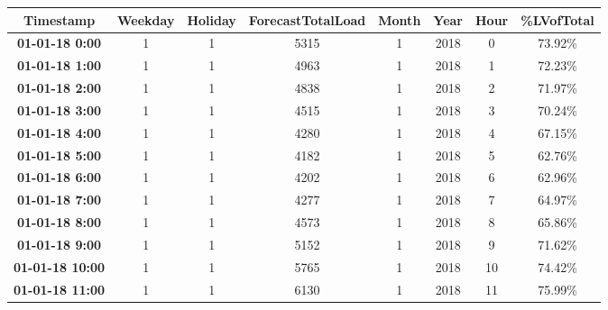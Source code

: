 \begin{table}[ht!]
\begin{tabular}{|c|c|c|c|c|c|c|c|}
\hline
\textbf{Timestamp}               & \textbf{Weekday} & \textbf{Holiday} & \textbf{ForecastTotalLoad} & \textbf{Month} & \textbf{Year} & \textbf{Hour} & \textbf{\%LVofTotal} \\ \hline
\textbf{01-01-18 0:00}  & 1                & 1                & 5315                       & 1              & 2018          & 0             & 73.92\%              \\ \hline
\textbf{01-01-18 1:00}  & 1                & 1                & 4963                       & 1              & 2018          & 1             & 72.23\%              \\ \hline
\textbf{01-01-18 2:00}  & 1                & 1                & 4838                       & 1              & 2018          & 2             & 71.97\%              \\ \hline
\textbf{01-01-18 3:00}  & 1                & 1                & 4515                       & 1              & 2018          & 3             & 70.24\%              \\ \hline
\textbf{01-01-18 4:00}  & 1                & 1                & 4280                       & 1              & 2018          & 4             & 67.15\%              \\ \hline
\textbf{01-01-18 5:00}  & 1                & 1                & 4182                       & 1              & 2018          & 5             & 62.76\%              \\ \hline
\textbf{01-01-18 6:00}  & 1                & 1                & 4202                       & 1              & 2018          & 6             & 62.96\%              \\ \hline
\textbf{01-01-18 7:00}  & 1                & 1                & 4277                       & 1              & 2018          & 7             & 64.97\%              \\ \hline
\textbf{01-01-18 8:00}  & 1                & 1                & 4573                       & 1              & 2018          & 8             & 65.86\%              \\ \hline
\textbf{01-01-18 9:00}  & 1                & 1                & 5152                       & 1              & 2018          & 9             & 71.62\%              \\ \hline
\textbf{01-01-18 10:00} & 1                & 1                & 5765                       & 1              & 2018          & 10            & 74.42\%              \\ \hline
\textbf{01-01-18 11:00} & 1                & 1                & 6130                       & 1              & 2018          & 11            & 75.99\%              \\ \hline
\end{tabular}
\end{table}

